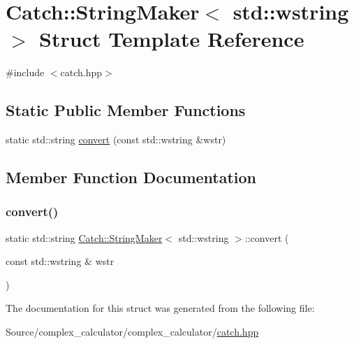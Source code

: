 \hypertarget{struct_catch_1_1_string_maker_3_01std_1_1wstring_01_4}{}\section{Catch\+:\+:String\+Maker$<$ std\+:\+:wstring $>$ Struct Template Reference}
\label{struct_catch_1_1_string_maker_3_01std_1_1wstring_01_4}


{\ttfamily \#include $<$catch.\+hpp$>$}

\subsection*{Static Public Member Functions}
\begin{DoxyCompactItemize}
\item 
static std\+::string \mbox{\hyperlink{struct_catch_1_1_string_maker_3_01std_1_1wstring_01_4_a375d49d6281bee4d36d853fa1bd5ebbd}{convert}} (const std\+::wstring \&wstr)
\end{DoxyCompactItemize}


\subsection{Member Function Documentation}
\mbox{\label{struct_catch_1_1_string_maker_3_01std_1_1wstring_01_4_a375d49d6281bee4d36d853fa1bd5ebbd}} 
\subsubsection{\texorpdfstring{convert()}{convert()}}
{\footnotesize\ttfamily static std\+::string \mbox{\hyperlink{struct_catch_1_1_string_maker}{Catch\+::\+String\+Maker}}$<$ std\+::wstring $>$\+::convert (\begin{DoxyParamCaption}\item[{const std\+::wstring \&}]{wstr }\end{DoxyParamCaption})\hspace{0.3cm}{\ttfamily [static]}}



The documentation for this struct was generated from the following file\+:\begin{DoxyCompactItemize}
\item 
Source/complex\+\_\+calculator/complex\+\_\+calculator/\mbox{\hyperlink{catch_8hpp}{catch.\+hpp}}\end{DoxyCompactItemize}
